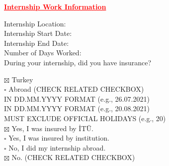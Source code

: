 \documentclass[12pt]{article}
\begin{document}
\vspace{150pt}

{\centering
  \textcolor{red}{\bfseries \ul{Internship Work Information}}
  \\[1\baselineskip]
  \par}

\begin{minipage}[t]{0.4\textwidth}
  \begin{flushright}
    Internship Location: \\[1\baselineskip]
    Internship Start Date: \\
    Internship End Date: \\
    Number of Days Worked: \\
    During your internship, did you have insurance?
  \end{flushright}
\end{minipage}%
\hspace{0.5cm}
\begin{minipage}[t]{0.6\textwidth}
  $\boxtimes$ Turkey \\
  $\square$ Abroad (CHECK RELATED CHECKBOX)\\
  IN DD.MM.YYYY FORMAT (e.g., 26.07.2021) \\
  IN DD.MM.YYYY FORMAT (e.g., 20.08.2021) \\
  MUST EXCLUDE OFFICIAL HOLIDAYS (e.g., 20) \\
  $\boxtimes$ Yes, I was insured by İTÜ. \\
  $\square$ Yes, I was insured by institution. \\
  $\square$ No, I did my internship abroad. \\
  $\boxtimes$ No. (CHECK RELATED CHECKBOX)\\
\end{minipage}


\newpage
{} %
\tableofcontents
{}  %
\newpage

\end{document}
